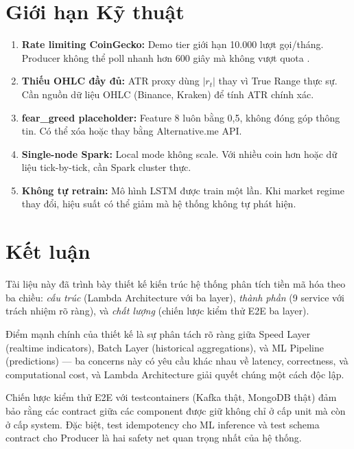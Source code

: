 \documentclass[12pt, a4paper]{article}
\begin{document}
\section{Giới hạn Kỹ thuật}

\begin{enumerate}
  \item \textbf{Rate limiting CoinGecko:} Demo tier giới hạn 10.000 lượt gọi/tháng.
    Producer không thể poll nhanh hơn 600 giây mà không vượt quota \cite{ref7}.

  \item \textbf{Thiếu OHLC đầy đủ:} ATR proxy dùng $|r_t|$ thay vì True Range thực
    sự. Cần nguồn dữ liệu OHLC (Binance, Kraken) để tính ATR chính xác.

  \item \textbf{fear\_greed placeholder:} Feature 8 luôn bằng 0,5, không đóng góp
    thông tin. Có thể xóa hoặc thay bằng Alternative.me API.

  \item \textbf{Single-node Spark:} Local mode không scale. Với nhiều coin hơn hoặc
    dữ liệu tick-by-tick, cần Spark cluster thực.

  \item \textbf{Không tự retrain:} Mô hình LSTM được train một lần. Khi market
    regime thay đổi, hiệu suất có thể giảm mà hệ thống không tự phát hiện.
\end{enumerate}

\section{Kết luận}

Tài liệu này đã trình bày thiết kế kiến trúc hệ thống phân tích tiền mã hóa theo
ba chiều: \textit{cấu trúc} (Lambda Architecture với ba layer), \textit{thành phần}
(9 service với trách nhiệm rõ ràng), và \textit{chất lượng} (chiến lược kiểm thử
E2E ba layer).

Điểm mạnh chính của thiết kế là sự phân tách rõ ràng giữa Speed Layer (realtime
indicators), Batch Layer (historical aggregations), và ML Pipeline (predictions) ---
ba concerns này có yêu cầu khác nhau về latency, correctness, và computational cost,
và Lambda Architecture giải quyết chúng một cách độc lập.

Chiến lược kiểm thử E2E với testcontainers (Kafka thật, MongoDB thật) đảm bảo rằng
các contract giữa các component được giữ không chỉ ở cấp unit mà còn ở cấp system.
Đặc biệt, test idempotency cho ML inference và test schema contract cho Producer là
hai safety net quan trọng nhất của hệ thống.



\end{document}
